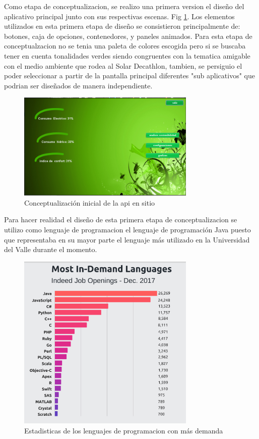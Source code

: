 Como etapa de conceptualizacion, se realizo una primera version el diseño del aplicativo principal junto con sus respectivas escenas. Fig \ref{fig_0}. Los elementos utilizados en esta primera etapa de diseño se consistieron principalmente de: botones, caja de opciones, contenedores, y paneles animados. Para esta etapa de conceptualzacion no se tenia una paleta de colores escogida pero si se buscaba tener en cuenta tonalidades verdes siendo congruentes con la tematica amigable con el medio ambiente que rodea al Solar Decathlon, tambien, se persiguio el poder seleccionar a partir de la pantalla principal diferentes "sub aplicativos" que podrian ser diseñados de manera independiente.

\begin{figure}[htbp]
	\centerline{\includegraphics[width=8.5cm]{figuras/houseManager1.png}}
	\caption{Conceptualización inicial de la api en sitio}
	\label{fig_0}
\end{figure}

Para hacer realidad el diseño de esta primera etapa de conceptualizacion se utilizo como lenguaje de programacion el lenguaje de programación Java puesto que representaba en su mayor parte el lenguaje más utilizado en la Universidad del Valle durante el momento.

\begin{figure}[htbp]
	\centerline{\includegraphics[width=8.5cm]{./figuras/stadistics_job.png}}
	\caption{Estadisticas de los lenguajes de programacion con más demanda}
	\label{fig_1}
\end{figure}


